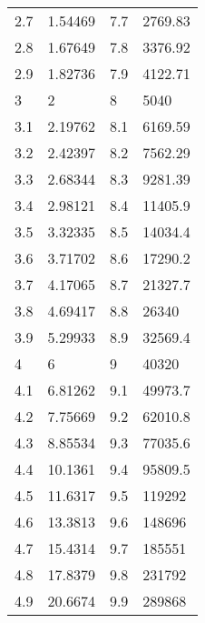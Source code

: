 \documentclass[12pt]{article}
\begin{document}
\begin{tabular}{|l|l|l|l|}
2.7 & 1.54469 & 7.7 & 2769.83 \\
2.8 & 1.67649 & 7.8 & 3376.92 \\
2.9 & 1.82736 & 7.9 & 4122.71 \\
3 & 2 & 8 & 5040 \\
3.1 & 2.19762 & 8.1 & 6169.59 \\
3.2 & 2.42397 & 8.2 & 7562.29 \\
3.3 & 2.68344 & 8.3 & 9281.39 \\
3.4 & 2.98121 & 8.4 & 11405.9 \\
3.5 & 3.32335 & 8.5 & 14034.4 \\
3.6 & 3.71702 & 8.6 & 17290.2 \\
3.7 & 4.17065 & 8.7 & 21327.7 \\
3.8 & 4.69417 & 8.8 & 26340 \\
3.9 & 5.29933 & 8.9 & 32569.4 \\
4 & 6 & 9 & 40320 \\
4.1 & 6.81262 & 9.1 & 49973.7 \\
4.2 & 7.75669 & 9.2 & 62010.8 \\
4.3 & 8.85534 & 9.3 & 77035.6 \\
4.4 & 10.1361 & 9.4 & 95809.5 \\
4.5 & 11.6317 & 9.5 & 119292 \\
4.6 & 13.3813 & 9.6 & 148696 \\
4.7 & 15.4314 & 9.7 & 185551 \\
4.8 & 17.8379 & 9.8 & 231792 \\
4.9 & 20.6674 & 9.9 & 289868 \\
\end{tabular}
\end{document}

